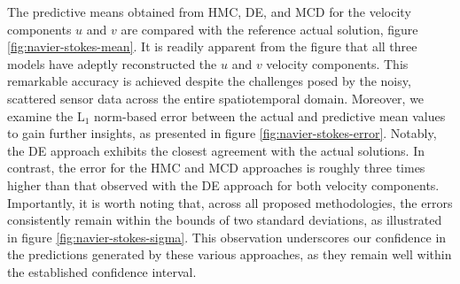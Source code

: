 \documentclass{article}
\begin{document}
The predictive means obtained from HMC, DE, and MCD for the velocity components $u$ and $v$ are compared with the reference actual solution, figure \ref{fig:navier-stokes-mean}. 
It is readily apparent from the figure that all three models have adeptly reconstructed the $u$ and $v$ velocity components. 
This remarkable accuracy is achieved despite the challenges posed by the noisy, scattered sensor data across the entire spatiotemporal domain.
Moreover, we examine the $\mathrm{L}_1$ norm-based error between the actual and predictive mean values to gain further insights, as presented in figure \ref{fig:navier-stokes-error}.
Notably, the DE approach exhibits the closest agreement with the actual solutions. 
In contrast, the error for the HMC and MCD approaches is roughly three times higher than that observed with the DE approach for both velocity components.
Importantly, it is worth noting that, across all proposed methodologies, the errors consistently remain within the bounds of two standard deviations, as illustrated in figure \ref{fig:navier-stokes-sigma}.
This observation underscores our confidence in the predictions generated by these various approaches, as they remain well within the established confidence interval.
%
\end{document}
